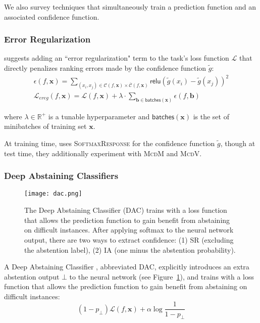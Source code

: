 \documentclass[11pt]{article}
\begin{document}
We also survey techniques that simultaneously train a prediction function and an associated confidence function. 

\subsubsection*{Error Regularization}

\cite{xin-etal-2021-art} suggests adding an ``error regularization" term to the task's loss function $\mathcal{L}$ that directly penalizes ranking errors made by the confidence function $\tilde{g}$:
\begin{gather*}
\epsilon(f, \mathbf{x}) = \sum_{(x_i, x_j) \in \mathcal{C}(f, \mathbf{x}) \times \overline{\mathcal{C}}(f, \mathbf{x})}\mathsf{relu}(\tilde{g}(x_i)-\tilde{g}(x_j))^2 \\
\mathcal{L}_{ereg}(f, \mathbf{x}) = \mathcal{L}(f, \mathbf{x}) + \lambda \cdot \sum_{\mathbf{b} \in \mathsf{batches}(\mathbf{x})} \epsilon(f, \mathbf{b})
\end{gather*}

\noindent where $\lambda \in \mathbb{R}^+$ is a tunable hyperparameter and $\mathsf{batches}(\mathbf{x})$ is the set of minibatches of training set $\mathbf{x}$.

At training time, \cite{xin-etal-2021-art} uses \textsc{SoftmaxResponse} for the confidence function $\tilde{g}$, though at test time, they additionally experiment with \textsc{McdM} and \textsc{McdV}.


\subsubsection*{Deep Abstaining Classifiers}

\begin{figure}
\centering
\texttt{[image: dac.png]}
\caption{The Deep Abstaining Classifier (DAC) trains with a loss function that allows the prediction function to gain benefit from abstaining on difficult instances. After applying softmax to the neural network output, there are two ways to extract confidence: (1) SR (excluding the abstention label), (2) IA (one minus the abstention probability).}
\label{fig:dac}
\end{figure}


A Deep Abstaining Classifier \cite{thulasidasan2019combating}, abbreviated DAC, explicitly introduces an extra abstention output $\bot$ to the neural network (see Figure~\ref{fig:dac}), and trains with a loss function that allows the prediction function to gain benefit from abstaining on difficult instances:
\begin{equation}
	(1-p_\bot) \mathcal{L}(f, \mathbf{x}) + \alpha \log \frac{1}{1-p_\bot}
\end{equation}
\end{document}
